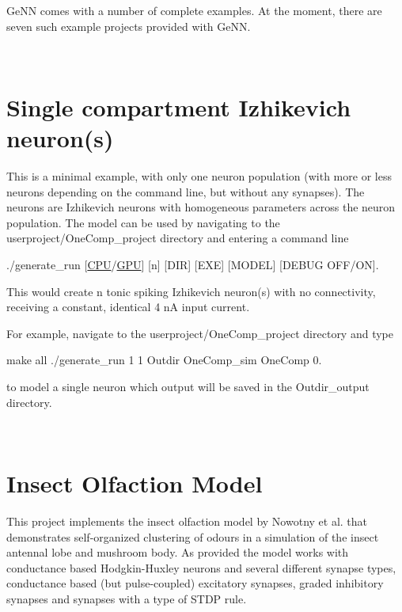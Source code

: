 Ge\+N\+N comes with a number of complete examples. At the moment, there are seven such example projects provided with Ge\+N\+N.

~\newline
\hypertarget{Examples_sec_Ex_OneComp}{}\section{Single compartment Izhikevich neuron(s)}\label{Examples_sec_Ex_OneComp}
This is a minimal example, with only one neuron population (with more or less neurons depending on the command line, but without any synapses). The neurons are Izhikevich neurons \cite{izhikevich2003simple} with homogeneous parameters across the neuron population. The model can be used by navigating to the {\ttfamily userproject/\+One\+Comp\+\_\+project} directory and entering a command line 
\begin{DoxyCode}
./generate\_run [\hyperlink{modelSpec_8h_ad703205f9a4d4bb6af9c25257c23ce6d}{CPU}/\hyperlink{modelSpec_8h_a39cb9803524b6f3b783344b2f89867b4}{GPU}] [n] [DIR] [EXE] [MODEL] [DEBUG OFF/ON].
\end{DoxyCode}
 This would create {\ttfamily n} tonic spiking Izhikevich neuron(s) with no connectivity, receiving a constant, identical 4 n\+A input current.

For example, navigate to the {\ttfamily userproject/\+One\+Comp\+\_\+project} directory and type 
\begin{DoxyCode}
make all
./generate\_run 1 1 Outdir OneComp\_sim OneComp 0.
\end{DoxyCode}
 to model a single neuron which output will be saved in the {\ttfamily Outdir\+\_\+output} directory.

~\newline
\hypertarget{Examples_sec_ex_mbody}{}\section{Insect Olfaction Model}\label{Examples_sec_ex_mbody}
This project implements the insect olfaction model by Nowotny et al. \cite{nowotny2005self} that demonstrates self-\/organized clustering of odours in a simulation of the insect antennal lobe and mushroom body. As provided the model works with conductance based Hodgkin-\/\+Huxley neurons \cite{Traub1991} and several different synapse types, conductance based (but pulse-\/coupled) excitatory synapses, graded inhibitory synapses and synapses with a type of S\+T\+D\+P rule.

